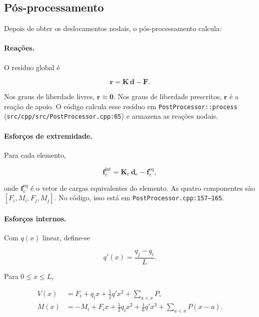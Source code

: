\documentclass[12pt,a4paper]{article}
\begin{document}
\subsection{Pós-processamento}
\label{sec:pos}

Depois de obter os deslocamentos nodais, o pós-processamento calcula:

\paragraph{Reações.}
O resíduo global é

\begin{equation}
  \mathbf{r} = \mathbf{K}\,\mathbf{d} - \mathbf{F}.
  \label{eq:residuo}
\end{equation}

Nos graus de liberdade livres, \(\mathbf{r}\approx\mathbf{0}\). Nos graus de liberdade prescritos, \(\mathbf{r}\) é a reação de apoio. O código calcula esse resíduo em \texttt{PostProcessor::process} (\texttt{src/cpp/src/PostProcessor.cpp:65}) e armazena as reações nodais.

\paragraph{Esforços de extremidade.}
Para cada elemento,

\begin{equation}
  \mathbf{f}_e^{\text{int}} = \mathbf{K}_e\,\mathbf{d}_e - \mathbf{f}_e^{\text{eq}},
  \label{eq:endforces}
\end{equation}

onde \(\mathbf{f}_e^{\text{eq}}\) é o vetor de cargas equivalentes do elemento. As quatro componentes são \([F_i, M_i, F_j, M_j]\). No código, isso está em \texttt{PostProcessor.cpp:157--165}.

\paragraph{Esforços internos.}
Com \(q(x)\) linear, define-se

\begin{equation}
  q'(x) = \frac{q_j-q_i}{L}.
  \label{eq:qslope}
\end{equation}

Para \(0\le x\le L\),

\begin{align}
  V(x) &= F_i + q_i x + \frac{1}{2}q' x^2
         + \sum_{a<x} P, \label{eq:Vx}\\
  M(x) &= -M_i + F_i x + \frac{1}{2}q_i x^2
         + \frac{1}{6}q' x^3
         + \sum_{a<x} P(x-a). \label{eq:Mx}
\end{align}
\end{document}
